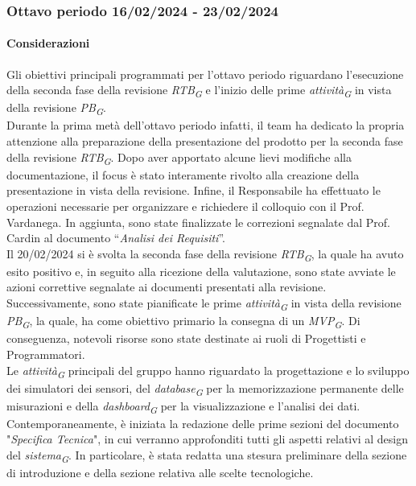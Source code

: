 \subsubsection{Ottavo periodo  16/02/2024 - 23/02/2024}
\paragraph{Considerazioni}

Gli obiettivi principali programmati per l’ottavo periodo riguardano l’esecuzione della seconda fase della revisione \textit{RTB}\textsubscript{\textit{G}} e l’inizio delle prime \textit{attività}\textsubscript{\textit{G}} in vista della revisione \textit{PB}\textsubscript{\textit{G}}. \\
Durante la prima metà dell’ottavo periodo infatti, il team ha dedicato la propria attenzione alla preparazione della presentazione del prodotto per la seconda fase della revisione \textit{RTB}\textsubscript{\textit{G}}. Dopo aver apportato alcune lievi modifiche alla documentazione, il focus è stato interamente rivolto alla creazione della presentazione in vista della revisione. Infine, il Responsabile ha effettuato le operazioni necessarie per organizzare e richiedere il colloquio con il Prof. Vardanega. In aggiunta, sono state finalizzate le correzioni segnalate dal Prof. Cardin al documento “\textit{Analisi dei Requisiti}”. \\
Il 20/02/2024 si è svolta la seconda fase della revisione \textit{RTB}\textsubscript{\textit{G}}, la quale ha avuto esito positivo e, in seguito alla ricezione della valutazione, sono state avviate le azioni correttive segnalate ai documenti presentati alla revisione. \\
Successivamente, sono state pianificate le prime \textit{attività}\textsubscript{\textit{G}} in vista della revisione \textit{PB}\textsubscript{\textit{G}}, la quale, ha come obiettivo primario la consegna di un \textit{MVP}\textsubscript{\textit{G}}. Di conseguenza, notevoli risorse sono state destinate ai ruoli di Progettisti e Programmatori. \\
Le \textit{attività}\textsubscript{\textit{G}} principali del gruppo hanno riguardato la progettazione e lo sviluppo dei simulatori dei sensori, del \textit{database}\textsubscript{\textit{G}} per la memorizzazione permanente delle misurazioni e della \textit{dashboard}\textsubscript{\textit{G}} per la visualizzazione e l’analisi dei dati.
Contemporaneamente, è iniziata la redazione delle prime sezioni del documento "\textit{Specifica Tecnica}", in cui verranno approfonditi tutti gli aspetti relativi al design del \textit{sistema}\textsubscript{\textit{G}}. In particolare, è stata redatta una stesura preliminare della sezione di introduzione e della sezione relativa alle scelte tecnologiche.

